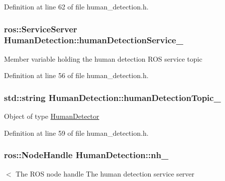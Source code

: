 Definition at line 62 of file human\-\_\-detection.\-h.

\hypertarget{classHumanDetection_a8b73e5d54ae1cc3e35e0d21b896838ab}{
\subsubsection[{human\-Detection\-Service\-\_\-}]{\setlength{\rightskip}{0pt plus 5cm}ros\-::\-Service\-Server Human\-Detection\-::human\-Detection\-Service\-\_\-\hspace{0.3cm}{\ttfamily [private]}}}\label{classHumanDetection_a8b73e5d54ae1cc3e35e0d21b896838ab}
Member variable holding the human detection R\-O\-S service topic 

Definition at line 56 of file human\-\_\-detection.\-h.

\hypertarget{classHumanDetection_a27ba857925ed27d7056a19099ae8e1d0}{
\subsubsection[{human\-Detection\-Topic\-\_\-}]{\setlength{\rightskip}{0pt plus 5cm}std\-::string Human\-Detection\-::human\-Detection\-Topic\-\_\-\hspace{0.3cm}{\ttfamily [private]}}}\label{classHumanDetection_a27ba857925ed27d7056a19099ae8e1d0}
Object of type \hyperlink{classHumanDetector}{Human\-Detector} 

Definition at line 59 of file human\-\_\-detection.\-h.

\hypertarget{classHumanDetection_a77c7804baa9488f9caa0b11eb97a579f}{
\subsubsection[{nh\-\_\-}]{\setlength{\rightskip}{0pt plus 5cm}ros\-::\-Node\-Handle Human\-Detection\-::nh\-\_\-\hspace{0.3cm}{\ttfamily [private]}}}\label{classHumanDetection_a77c7804baa9488f9caa0b11eb97a579f}
$<$ The R\-O\-S node handle The human detection service server 

